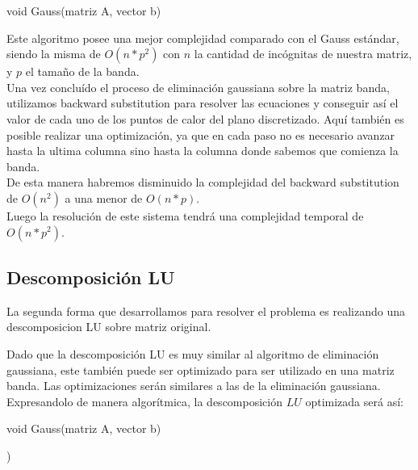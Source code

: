 \begin{algorithm}
\begin{algorithmic}[1]\parskip=1mm
\caption{void Gauss(matriz A, vector b)}
\end{algorithmic}
\end{algorithm}

Este algoritmo posee una mejor complejidad comparado con el Gauss estándar, siendo la misma de $O(n*p^2)$ con $n$ la cantidad de incógnitas de nuestra matriz, y $p$ el tamaño de la banda.
\\
Una vez concluído el proceso de eliminación gaussiana sobre la matriz banda, utilizamos backward substitution para resolver las ecuaciones y conseguir así el valor de cada uno de los puntos de calor del plano discretizado. Aquí también es posible realizar una optimización, ya que en cada paso no es necesario avanzar hasta la ultima columna sino hasta la columna donde sabemos que comienza la banda.
\\
De esta manera habremos disminuido la complejidad del backward substitution de $O(n^2)$ a una menor de $O(n*p)$.
\ExplicarMEJOR
\\
Luego la resolución de este sistema tendrá una complejidad temporal de $O(n*p^2)$.

\subsection{Descomposición LU}

La segunda forma que desarrollamos para resolver el problema es realizando una descomposicion LU sobre matriz original.

Dado que la descomposición LU es muy similar al algoritmo de eliminación gaussiana, este también puede ser optimizado para ser utilizado en una matriz banda. Las optimizaciones serán similares a las de la eliminación gaussiana. Expresandolo de manera algorítmica, la descomposición $LU$ optimizada será así:

\begin{algorithm}
\begin{algorithmic}[1]\parskip=1mm
\caption{void Gauss(matriz A, vector b)}
   )
\end{algorithmic}
\end{algorithm}

